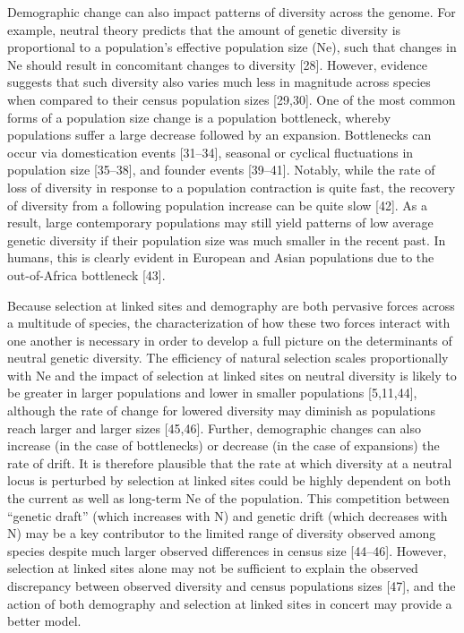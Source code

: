 \documentclass[9pt,twocolumn,twoside]{rilabRxiv}
\begin{document}
Demographic change can also impact patterns of diversity across the genome.
For example, neutral theory predicts that the amount of genetic diversity is proportional to a population’s effective population size (Ne), such that changes in Ne should result in concomitant changes to diversity [28].
However, evidence suggests that such diversity also varies much less in magnitude across species when compared to their census population sizes [29,30].
One of the most common forms of a population size change is a population bottleneck, whereby populations suffer a large decrease followed by an expansion.
Bottlenecks can occur via domestication events [31–34], seasonal or cyclical fluctuations in population size [35–38], and founder events [39–41].
Notably, while the rate of loss of diversity in response to a population contraction is quite fast, the recovery of diversity from a following population increase can be quite slow [42].
As a result,  large contemporary populations may still yield patterns of low average genetic diversity if their population size was much smaller in the recent past.
In humans, this is clearly evident in European and Asian populations due to the out-of-Africa bottleneck [43].

Because selection at linked sites and demography are both pervasive forces across a multitude of species, the characterization of how these two forces interact with one another is necessary in order to develop a full picture on the determinants of neutral genetic diversity.
The efficiency of natural selection scales proportionally with Ne and the impact of selection at linked sites on neutral diversity is likely to be greater in larger populations and lower in smaller populations [5,11,44], although the rate of change for lowered diversity may diminish as populations reach larger and larger sizes [45,46].
Further, demographic changes can also increase (in the case of bottlenecks) or decrease (in the case of expansions) the rate of drift.
It is therefore plausible that the rate at which diversity at a neutral locus is perturbed by selection at linked sites could be highly dependent on both the current as well as long-term Ne of the population.
This competition between “genetic draft” (which increases with N) and genetic drift (which decreases with N) may be a key contributor to the limited range of diversity observed among species  despite much larger observed differences in census size [44–46].
However, selection at linked sites alone may not be sufficient to explain the observed discrepancy between observed diversity and census populations sizes [47], and the action of both demography and selection at linked sites in concert may provide a better model.
\end{document}
